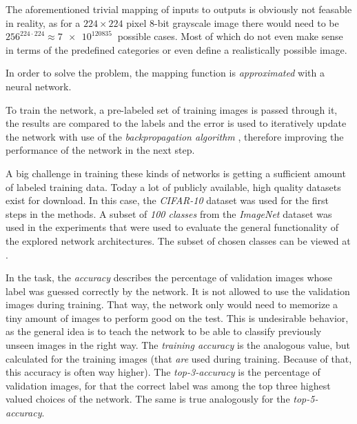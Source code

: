 The aforementioned trivial mapping of inputs to outputs is obviously not feasable in reality, as for a $224\times 224$ pixel 8-bit grayscale image there would need to be $256^{224\cdot 224} \approx \SI[]{7e120835}[]{}$ possible cases. Most of which do not even make sense in terms of the predefined categories or even define a realistically possible image.

In order to solve the problem, the mapping function is \emph{approximated} with a neural network. 

To train the network, a pre-labeled set of training images is passed through it, the results are compared to the labels and the error is used to iteratively update the network with use of the \emph{backpropagation algorithm} \cite{machineLearningMitchell}, therefore improving the performance of the network in the next step.

A big challenge in training these kinds of networks is getting a sufficient amount of labeled training data. 
Today a lot of publicly available, high quality datasets exist for download. 
In this case, the \emph{CIFAR-10} \cite{cifarDataset} dataset was used for the first steps in the methods. 
A subset of \emph{100 classes} from the \emph{ImageNet} \cite{imagenetDataset} dataset was used in the experiments that were used to evaluate the general functionality of the explored network architectures.
The subset of chosen classes can be viewed at .

In the task, the \emph{accuracy} describes the percentage of validation images whose label was guessed correctly by the network. It is not allowed to use the validation images during training. That way, the network only would need to memorize a tiny amount of images to perform good on the test. This is undesirable behavior, as the general idea is to teach the network to be able to classify previously unseen images in the right way. The \emph{training accuracy} is the analogous value, but calculated for the training images (that \emph{are} used during training. Because of that, this accuracy is often way higher).
The \emph{top-3-accuracy} is the percentage of validation images, for that the correct label was among the top three highest valued choices of the network. The same is true analogously for the \emph{top-5-accuracy}.